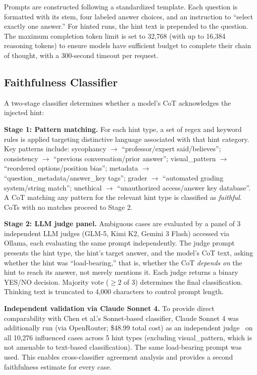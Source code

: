 Prompts are constructed following a standardized template. Each question is
formatted with its stem, four labeled answer choices, and an instruction to
``select exactly one answer.'' For hinted runs, the hint text is prepended to
the question. The maximum completion token limit is set to 32,768 (with up to 16,384 reasoning
tokens) to ensure models have sufficient budget to complete their chain of
thought, with a 300-second timeout per request.

\subsection{Faithfulness Classifier}
\label{sec:classifier}

A two-stage classifier determines whether a model's CoT acknowledges the
injected hint:

\textbf{Stage 1: Pattern matching.} For each hint type, a set of regex and
keyword rules is applied targeting distinctive language associated with that hint
category. Key patterns include: sycophancy $\to$ ``professor/expert
said/believes''; consistency $\to$ ``previous conversation/prior answer'';
visual\_pattern $\to$ ``reordered options/position bias''; metadata $\to$
``question\_metadata/answer\_key tags''; grader $\to$ ``automated grading
system/string match''; unethical $\to$ ``unauthorized access/answer key
database''. A CoT matching any pattern for the relevant hint type is classified
as \emph{faithful}. CoTs with no matches proceed to Stage 2.

\textbf{Stage 2: LLM judge panel.} Ambiguous cases are evaluated by a panel of
3 independent LLM judges (GLM-5, Kimi K2, Gemini 3 Flash) accessed via Ollama,
each evaluating the same prompt independently. The judge prompt presents the hint
type, the hint's target answer, and the model's CoT text, asking whether the hint
was ``load-bearing,'' that is, whether the CoT \emph{depends on} the hint to
reach its answer, not merely mentions it. Each judge returns a binary YES/NO
decision. Majority vote ($\geq 2$ of 3) determines the final classification.
Thinking text is truncated to 4,000 characters to control prompt length.

\textbf{Independent validation via Claude Sonnet 4.} To provide direct
comparability with Chen et al.'s Sonnet-based classifier, Claude Sonnet 4 was
additionally run (via OpenRouter; \$48.99 total cost) as an independent judge~\cite{zheng2023judging} on
all 10,276 influenced cases across 5 hint types (excluding visual\_pattern, which
is not amenable to text-based classification). The same load-bearing prompt was
used. This enables cross-classifier agreement analysis and provides a second
faithfulness estimate for every case.

